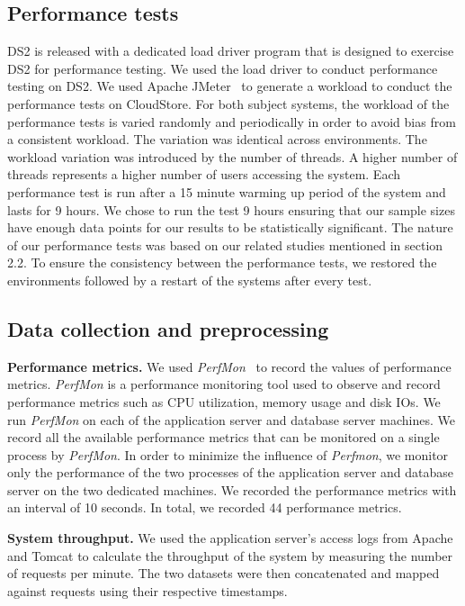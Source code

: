 \documentclass[smallextended]{svjour3}       %
\begin{document}
\subsection{Performance tests}

DS2 is released with a dedicated load driver program that is designed to exercise DS2 for performance testing. We used the load driver to conduct performance testing on DS2. We used Apache JMeter~\cite{apachejmeter} to generate a workload to conduct the performance tests on CloudStore. For both subject systems, the workload of the performance tests is varied randomly and periodically in order to avoid bias from a consistent workload. The variation was identical across environments. The workload variation was introduced by the number of threads. A higher number of threads represents a higher number of users accessing the system. Each performance test is run after a 15 minute warming up period of the system and lasts for 9 hours. We chose to run the test 9 hours ensuring that our sample sizes have enough data points for our results to be statistically significant.
The nature of our performance tests was based on our related studies mentioned in section 2.2. To ensure the consistency between the performance tests, we restored the environments followed by a restart of the systems after every test.


\subsection{Data collection and preprocessing}

\noindent \textbf{Performance metrics.} We used \textit{PerfMon}~\cite{perfmon} to record the values of performance metrics. \textit{PerfMon} is a performance monitoring tool used to observe and record performance metrics such as CPU utilization, memory usage and disk IOs. We run \textit{PerfMon} on each of the application server and database server machines. We record all the available performance metrics that can be monitored on a single process by \emph{PerfMon}. In order to minimize the influence of \textit{Perfmon}, we monitor only the performance of the two processes of the application server and database server on the two dedicated machines. We recorded the performance metrics with an interval of 10 seconds. In total, we recorded 44 performance metrics.

\noindent \textbf{System throughput.} We used the application server's access logs from Apache and Tomcat to calculate the throughput of the system by measuring the number of requests per minute. The two datasets were then concatenated and mapped against requests using their respective timestamps.
\end{document}
